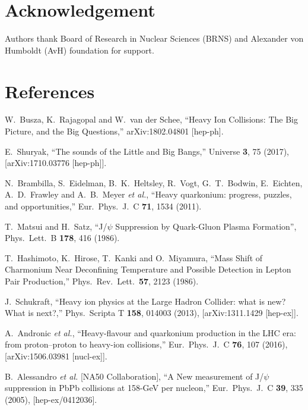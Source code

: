 \documentclass[12pt,a4paper,final]{iopart} %
\begin{document}
\section{Acknowledgement}
Authors thank Board of Research in Nuclear Sciences (BRNS) and Alexander von Humboldt (AvH)
foundation for support. 

%
%

\section*{References}
\begin{thebibliography}{100}

  W.~Busza, K.~Rajagopal and W.~van der Schee,
  ``Heavy Ion Collisions: The Big Picture, and the Big Questions,''
  arXiv:1802.04801 [hep-ph].
  

 
  E.~Shuryak,
  ``The sounds of the Little and Big Bangs,''
  Universe {\bf 3}, 75 (2017),
  [arXiv:1710.03776 [hep-ph]].
  

  N.~Brambilla, S.~Eidelman, B.~K.~Heltsley, R.~Vogt, G.~T.~Bodwin, E.~Eichten, A.~D.~Frawley and A.~B.~Meyer {\it et al.},
  ``Heavy quarkonium: progress, puzzles, and opportunities,''
  Eur.\ Phys.\ J.\ C {\bf 71}, 1534 (2011).


 T.~Matsui and H.~Satz,
 ``J/$\psi$ Suppression by Quark-Gluon Plasma Formation'',
 Phys.\ Lett.\ B {\bf 178}, 416 (1986).

  T.~Hashimoto, K.~Hirose, T.~Kanki and O.~Miyamura,
  ``Mass Shift of Charmonium Near Deconfining Temperature and Possible Detection in Lepton Pair Production,''
  Phys.\ Rev.\ Lett.\  {\bf 57}, 2123 (1986).



  J.~Schukraft,
  ``Heavy ion physics at the Large Hadron Collider: what is new? What is next?,''
  Phys.\ Scripta T {\bf 158}, 014003 (2013), [arXiv:1311.1429 [hep-ex]].
  

  A.~Andronic {\it et al.},
  ``Heavy-flavour and quarkonium production in the LHC era: from proton–proton to heavy-ion collisions,''
  Eur.\ Phys.\ J.\ C {\bf 76}, 107 (2016), [arXiv:1506.03981 [nucl-ex]].


  B.~Alessandro {\it et al.} [NA50 Collaboration],
  ``A New measurement of J/$\psi$ suppression in PbPb collisions at 158-GeV per nucleon,''
  Eur.\ Phys.\ J.\ C {\bf 39}, 335 (2005), [hep-ex/0412036].
 

\end{thebibliography}
\end{document}
